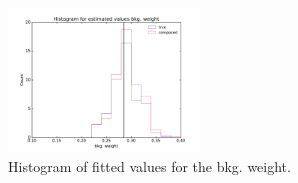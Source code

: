 \documentclass[a4paper]{jpconf}
\begin{document}
\begin{figure}[h]
\begin{minipage}{11pc}
\includegraphics[width=12pc]{c1c2_train_mlp_c2_hist.pdf}
\caption{\label{fig:hist2}  Histogram of fitted values for the bkg. weight.}
\end{minipage}
\end{figure}
\end{document}
